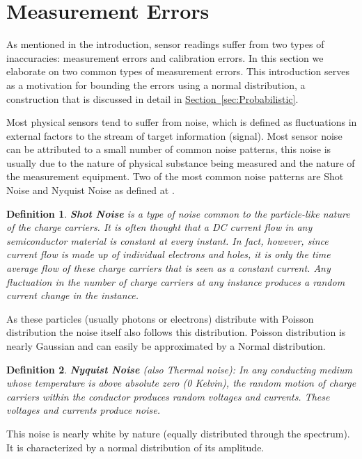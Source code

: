\documentclass[preprint,12pt]{elsarticle}
\newtheorem{definition}{Definition}
\newcommand{\namedref}[2]{\hyperref[#2]{#1~\ref*{#2}}}
\newcommand{\sectionref}[1]{\namedref{Section}{#1}}
\begin{document}
\section{Measurement Errors}\label{sec:Errors}
As mentioned in the introduction, sensor readings suffer from two types of inaccuracies: measurement errors
and calibration errors. In this section we elaborate on two common types of measurement errors.
This introduction serves as a motivation for bounding the errors using a normal distribution,
a construction that is discussed in detail in \sectionref{sec:Probabilistic}.

Most physical sensors tend to suffer from noise, which is defined as fluctuations in external factors to the stream of target information (signal). Most sensor noise can be attributed to a small number of common noise patterns, this noise is usually due to the nature of physical substance being measured and the nature of the measurement equipment. Two of the most common noise patterns are Shot Noise and Nyquist Noise as defined at \cite{RFCD97}.

\begin{definition}\label{def:ShotNoise}
{\bf Shot Noise} is a type of noise common to the particle-like nature of the charge carriers. It is often thought that a DC current flow in any semiconductor material is constant at every instant. In fact, however, since current flow is made up of individual electrons and holes, it is only the time average flow of these charge carriers that is seen as a constant current. Any fluctuation in the number of charge carriers at any instance produces a random current change in the instance.
\end{definition}
 As these particles (usually photons or electrons) distribute with Poisson distribution the noise itself also follows this distribution. Poisson distribution is nearly Gaussian and can easily be approximated by a Normal distribution.

\begin{definition}\label{def:NyquistNoise}
{\bf Nyquist Noise} (also Thermal noise): In any conducting medium whose temperature is above absolute zero (0 Kelvin), the random motion of charge carriers within the conductor produces random voltages and currents. These voltages and currents produce noise.
\end{definition}
 This noise is nearly white by nature (equally distributed through the spectrum). It is characterized by a normal distribution of its amplitude.
\end{document}
